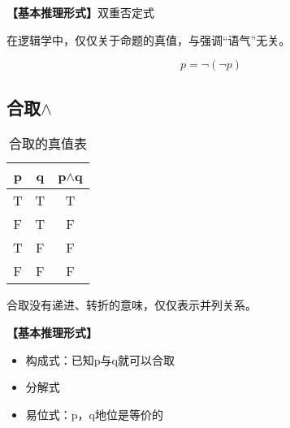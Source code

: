 \documentclass[12pt,onecolumn,a4paper]{book}
\numberwithin{table}{subsection}
\numberwithin{equation}{subsection}
\begin{document}
\textbf{【基本推理形式】}双重否定式

在逻辑学中，仅仅关于命题的真值，与强调“语气”无关。

\begin{equation}
     p = \neg(\neg p)
\end{equation}


\subsection{合取$\wedge$}

\begin{table}[h]
    \centering
    \setlength{\tabcolsep}{5mm}
    \begin{tabular}{ccc}
        \toprule
        p & q & p$\wedge$q \\ 
        \midrule
        T & T & T\\
        F & T & F\\
        T & F & F\\
        F & F & F\\
        \bottomrule
    \end{tabular}
    \caption{合取的真值表}
\end{table}

合取没有递进、转折的意味，仅仅表示并列关系。

\textbf{【基本推理形式】}

\begin{itemize}[itemsep=0pt,parsep=0pt]
    \item 构成式：已知p与q就可以合取
    \item 分解式
    \item 易位式：p，q地位是等价的
\end{itemize}
\end{document}
